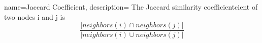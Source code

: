 
{
  name=Jaccard Coefficient,
  description={ The Jaccard similarity coefficientcient of two nodes i and j is
	$$ \frac{|neighbors(i) \cap neighbors(j)|}{|neighbors(i) \cup neighbors(j)|} $$
  }
}


